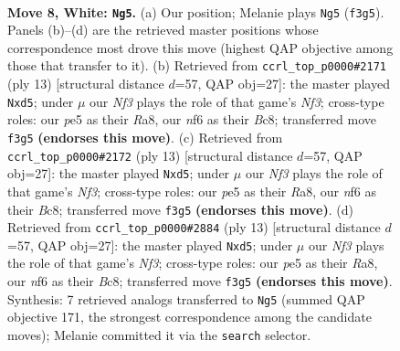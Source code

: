 \documentclass[11pt]{article}
\begin{document}
\begin{figure}[p]\centering
\begin{subfigure}{0.46\textwidth}\centering
\resizebox{\linewidth}{!}{%
\newchessgame
\chessboard[
  setfen={r1bq1rk1/p1p2ppp/2pp1n2/4p3/1b2P3/2NP1N2/PPP2PPP/R1BQ1RK1 w - - 0 8},
  showmover=false,
  pgfstyle=straightmove, color=movearrow, markmove={f3-g5}
]}
\caption{}
\end{subfigure}\hfill
\begin{subfigure}{0.46\textwidth}\centering
\resizebox{\linewidth}{!}{%
\newchessgame
\chessboard[
  setfen={r1bq1rk1/ppp1ppbp/2n2np1/3P4/3P4/5NP1/PP2PPBP/RNBQ1RK1 b - - 0 7},
  showmover=false,
  pgfstyle=straightmove, color=movearrow, markmove={f6-d5}
]}
\caption{}
\end{subfigure}
\\[4pt]
\begin{subfigure}{0.46\textwidth}\centering
\resizebox{\linewidth}{!}{%
\newchessgame
\chessboard[
  setfen={r1bq1rk1/ppp1ppbp/2n2np1/3P4/3P4/5NP1/PP2PPBP/RNBQ1RK1 b - - 0 7},
  showmover=false,
  pgfstyle=straightmove, color=movearrow, markmove={f6-d5}
]}
\caption{}
\end{subfigure}\hfill
\begin{subfigure}{0.46\textwidth}\centering
\resizebox{\linewidth}{!}{%
\newchessgame
\chessboard[
  setfen={r1bq1rk1/ppp1ppbp/2n2np1/3P4/3P4/5NP1/PP2PPBP/RNBQ1RK1 b - - 0 7},
  showmover=false,
  pgfstyle=straightmove, color=movearrow, markmove={f6-d5}
]}
\caption{}
\end{subfigure}
\caption{\textbf{Move 8, White: \texttt{Ng5}.} (a) Our position; Melanie plays \texttt{Ng5} (\texttt{f3g5}). Panels (b)--(d) are the retrieved master positions whose correspondence most drove this move (highest QAP objective among those that transfer to it). (b) Retrieved from \texttt{ccrl\_top\_p0000\#2171} (ply 13) [structural distance $d$=57, QAP obj=27]: the master played \texttt{Nxd5}; under $\mu$ our \emph{Nf3} plays the role of that game's \emph{Nf3}; cross-type roles: our \emph{p}e5 as their \emph{R}a8, our \emph{n}f6 as their \emph{B}c8; transferred move \texttt{f3g5} \textbf{(endorses this move)}. (c) Retrieved from \texttt{ccrl\_top\_p0000\#2172} (ply 13) [structural distance $d$=57, QAP obj=27]: the master played \texttt{Nxd5}; under $\mu$ our \emph{Nf3} plays the role of that game's \emph{Nf3}; cross-type roles: our \emph{p}e5 as their \emph{R}a8, our \emph{n}f6 as their \emph{B}c8; transferred move \texttt{f3g5} \textbf{(endorses this move)}. (d) Retrieved from \texttt{ccrl\_top\_p0000\#2884} (ply 13) [structural distance $d$=57, QAP obj=27]: the master played \texttt{Nxd5}; under $\mu$ our \emph{Nf3} plays the role of that game's \emph{Nf3}; cross-type roles: our \emph{p}e5 as their \emph{R}a8, our \emph{n}f6 as their \emph{B}c8; transferred move \texttt{f3g5} \textbf{(endorses this move)}. Synthesis: 7 retrieved analogs transferred to \texttt{Ng5} (summed QAP objective 171, the strongest correspondence among the candidate moves); Melanie committed it via the \texttt{search} selector.}
\label{fig:thought-m14}
\end{figure}
\end{document}
